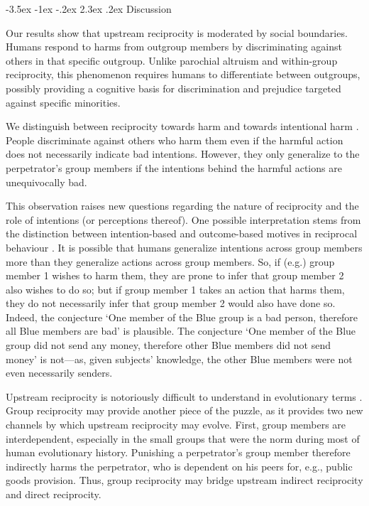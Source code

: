 \documentclass[12pt,a4paper]{article}\usepackage[]{graphicx}\usepackage[]{color}
\makeatletter
\renewcommand\section{\@startsection {section}{1}{\z@}%
{-3.5ex \@plus -1ex \@minus -.2ex}%
{2.3ex \@plus.2ex}%
{\bf\sffamily\Large}}
\makeatother
\begin{document}
\section{Discussion}
\label{sec:conclusion}

Our results show that upstream reciprocity is moderated by social boundaries. 
Humans respond to harms from outgroup members by discriminating against others 
in that specific outgroup. Unlike parochial altruism and within-group reciprocity, 
this phenomenon requires humans to differentiate between outgroups, possibly 
providing a cognitive basis for discrimination and prejudice targeted against specific minorities. 

We distinguish between reciprocity towards harm and towards intentional harm
\citep{stanca2009testing}. People discriminate against others who harm them even
if the harmful action does not necessarily indicate bad intentions. However,
they only generalize to the perpetrator's  group members if the intentions
behind the harmful actions are unequivocally bad.

This observation raises new questions regarding the nature of reciprocity
and the role of intentions (or perceptions thereof). One possible
interpretation stems from the distinction between intention-based
and outcome-based motives in reciprocal behaviour \citep{falk2006theory}. It is
possible that humans generalize intentions across group members more than they generalize
actions across group members. So, if (e.g.)  group member 1 wishes to harm them,  they are prone to infer
that group member 2 also wishes to do so; but if group member 1 takes an action
that harms them, they do not necessarily infer that group member 2 would also
have done so. Indeed, the conjecture `One member of the Blue
group is a bad person, therefore all Blue members are bad' is plausible.
The conjecture `One member of the Blue group did not send any money,
therefore other Blue members did not send money' is not---as, given subjects' knowledge, the other
Blue members were not even necessarily senders.

Upstream reciprocity is notoriously difficult to understand in evolutionary
terms \citep{boyd1989evolution,nowak2007upstream}. Group reciprocity
may provide another piece of the puzzle, as it provides two new channels
by which upstream reciprocity may evolve. First, group members are
interdependent, especially in the small groups that were the norm
during most of human evolutionary history. Punishing a perpetrator's
group member therefore indirectly harms the perpetrator, who is dependent
on his peers for, e.g., public goods provision. Thus, group reciprocity
may bridge upstream indirect reciprocity and direct reciprocity.
\end{document}
